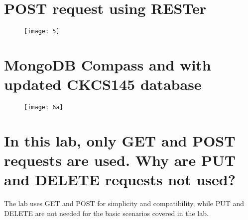 \documentclass[letterpaper,11pt]{texMemo2} %
\begin{document}
	\section{POST request using RESTer}
	
	\begin{figure}[htp]
		\centering 
		
			\texttt{[image: 5]}%

		
	\end{figure}
	
		\section{MongoDB Compass and with updated CKCS145 database}
	
	\begin{figure}[htp]
		\centering 

			\texttt{[image: 6a]}%
		
		
		
	\end{figure}
	\section{In this lab, only GET and POST requests are used. Why are PUT and DELETE requests not used?}
	 The lab uses GET and POST for simplicity and compatibility, while PUT and DELETE are not needed for the basic scenarios covered in the lab.
	
\end{document}
